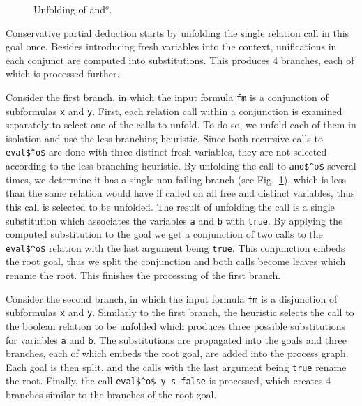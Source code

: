 \begin{figure}[!t]
  \centering
  \begin{minipage}{0.95\textwidth}
    
  \end{minipage}
  \caption{Unfolding of and$^o$.}
  \label{fig:and}
\end{figure}


Conservative partial deduction starts by unfolding the single relation call in this goal once.
Besides introducing fresh variables into the context, unifications in each conjunct are computed into substitutions.
This produces 4 branches, each of which is processed further.

Consider the first branch, in which the input formula \lstinline{fm} is a conjunction of subformulas \lstinline{x} and \lstinline{y}.
First, each relation call within a conjunction is examined separately to select one of the calls to unfold.
To do so, we unfold each of them in isolation and use the less branching heuristic.
Since both recursive calls to \lstinline{eval$^o$} are done with three distinct fresh variables, they are not selected according to the less branching heuristic.
By unfolding the call to \lstinline{and$^o$} several times, we determine it has a single non-failing branch (see Fig.~\ref{fig:and}), which is less than the same relation would have if called on all free and distinct variables, thus this call is selected to be unfolded.
The result of unfolding the call is a single substitution which associates the variables \lstinline{a} and \lstinline{b} with \lstinline{true}.
By applying the computed substitution to the goal we get a conjunction of two calls to the \lstinline{eval$^o$} relation with the last argument being \lstinline{true}.
This conjunction embeds the root goal, thus we split the conjunction and both calls become leaves which rename the root.
This finishes the processing of the first branch.

Consider the second branch, in which the input formula \lstinline{fm} is a disjunction of subformulas \lstinline{x} and \lstinline{y}.
Similarly to the first branch, the heuristic selects the call to the boolean relation to be unfolded which produces three possible substitutions for variables \lstinline{a} and \lstinline{b}.
The substitutions are propagated into the goals and three branches, each of which embeds the root goal, are added into the process graph.
Each goal is then split, and the calls with the last argument being \lstinline{true} rename the root.
Finally, the call \lstinline{eval$^o$ y s false} is processed, which creates 4 branches similar to the branches of the root goal.


